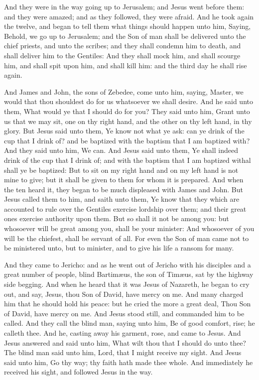  And they were in the way going up to Jerusalem; and
Jesus went before them: and they were amazed; and as they followed, they
were afraid. And he took again the twelve, and began to tell them what
things should happen unto him,  Saying, Behold, we go up to
Jerusalem; and the Son of man shall be delivered unto the chief priests,
and unto the scribes; and they shall condemn him to death, and shall
deliver him to the Gentiles:  And they shall mock him, and
shall scourge him, and shall spit upon him, and shall kill him: and the
third day he shall rise again.

 And James and John, the sons of Zebedee, come unto him,
saying, Master, we would that thou shouldest do for us whatsoever we
shall desire.  And he said unto them, What would ye that I
should do for you?  They said unto him, Grant unto us that
we may sit, one on thy right hand, and the other on thy left hand, in
thy glory.  But Jesus said unto them, Ye know not what ye
ask: can ye drink of the cup that I drink of? and be baptized with the
baptism that I am baptized with?  And they said unto him,
We can. And Jesus said unto them, Ye shall indeed drink of the cup that
I drink of; and with the baptism that I am baptized withal shall ye be
baptized:  But to sit on my right hand and on my left hand
is not mine to give; but it shall be given to them for whom it is
prepared.  And when the ten heard it, they began to be much
displeased with James and John.  But Jesus called them to
him, and saith unto them, Ye know that they which are accounted to rule
over the Gentiles exercise lordship over them; and their great ones
exercise authority upon them.  But so shall it not be among
you: but whosoever will be great among you, shall be your minister:
 And whosoever of you will be the chiefest, shall be
servant of all.  For even the Son of man came not to be
ministered unto, but to minister, and to give his life a ransom for
many.

 And they came to Jericho: and as he went out of Jericho
with his disciples and a great number of people, blind Bartimæus, the
son of Timæus, sat by the highway side begging.  And when
he heard that it was Jesus of Nazareth, he began to cry out, and say,
Jesus, thou Son of David, have mercy on me.  And many
charged him that he should hold his peace: but he cried the more a great
deal, Thou Son of David, have mercy on me.  And Jesus stood
still, and commanded him to be called. And they call the blind man,
saying unto him, Be of good comfort, rise; he calleth thee.
 And he, casting away his garment, rose, and came to Jesus.
 And Jesus answered and said unto him, What wilt thou that
I should do unto thee? The blind man said unto him, Lord, that I might
receive my sight.  And Jesus said unto him, Go thy way; thy
faith hath made thee whole. And immediately he received his sight, and
followed Jesus in the way.

